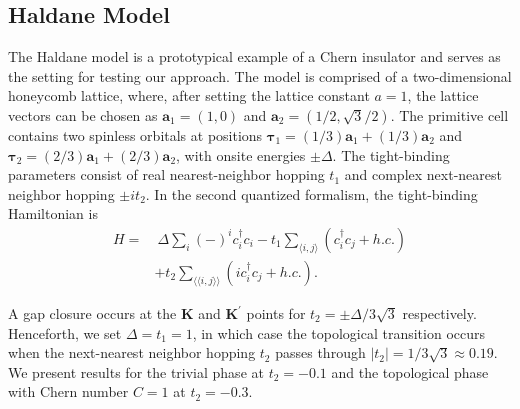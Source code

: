 \documentclass[galley,aps,pra,10pt,amsmath,amssymb,
    superscriptaddress,nofootinbib,longbibliography]{revtex4-2}
\begin{document}
\subsection{Haldane Model}

The Haldane model is a prototypical example of a Chern insulator and serves as the setting for testing our approach. The model is comprised of a two-dimensional honeycomb lattice, where, after setting the lattice constant $a=1$, the lattice vectors can be chosen as $\mathbf{a}_1 = (1, 0)$ and $\mathbf{a}_2 = (1/2, \sqrt{3}/2)$. The primitive cell contains two spinless orbitals at positions $\mathbf{\tau}_1 = (1/3) \mathbf{a}_1 + (1/3) \mathbf{a}_2$ and $\mathbf{\tau}_2 = (2/3) \mathbf{a}_1 + (2/3) \mathbf{a}_2$, with onsite energies $\pm \Delta$. The tight-binding parameters consist of real nearest-neighbor hopping $t_1$ and complex next-nearest neighbor hopping $\pm it_2$. In the second quantized formalism, the tight-binding Hamiltonian is
\begin{equation}
    \begin{split}
     H = &\ \Delta \sum_i (-)^{i} c_i^{\dagger} c_i -t_1 \sum_{\langle i, j \rangle} (c_i^{\dagger}c_j + h.c.) \\ &+ t_2 \sum_{\langle\langle i, j \rangle\rangle} (i c_i^{\dagger}c_j +h.c. ) .
    \end{split}
\end{equation}

A gap closure occurs at the $\mathbf{K}$ and $\mathbf{K}^\prime$ points for $t_2 = \pm \Delta / 3\sqrt{3}$ respectively. Henceforth, we set $\Delta = t_1 = 1$, in which case the topological transition occurs when the next-nearest neighbor hopping $t_2$ passes through $|t_2|=1/3\sqrt{3}\approx 0.19$. We present results for the trivial phase at $t_2=-0.1$ and the topological phase with Chern number $C=1$ at $t_2=-0.3$.
\end{document}
